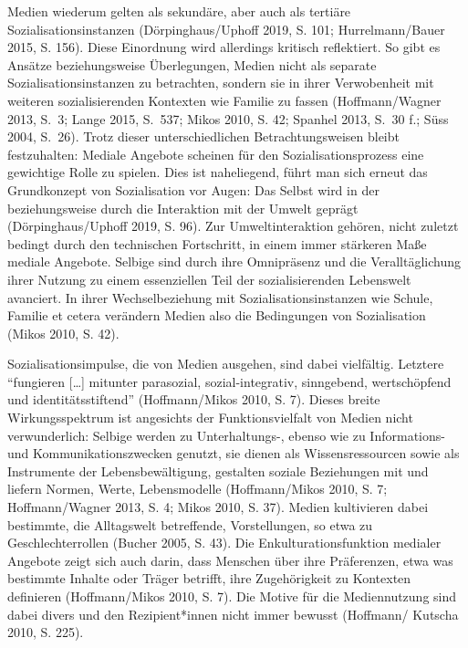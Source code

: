 \documentclass[a4paper,
fontsize=11pt,
oneside,
numbers=noperiodatend,
parskip=half-,
bibliography=totoc,
final
]{scrartcl}
\begin{document}
Medien wiederum gelten als sekundäre, aber auch als tertiäre
Sozialisationsinstanzen (Dörpinghaus/Uphoff 2019, S. 101;
Hurrelmann/Bauer 2015, S. 156). Diese Einordnung wird allerdings
kritisch reflektiert. So gibt es Ansätze beziehungsweise Überlegungen,
Medien nicht als separate Sozialisationsinstanzen zu betrachten, sondern
sie in ihrer Verwobenheit mit weiteren sozialisierenden Kontexten wie
Familie zu fassen (Hoffmann/Wagner 2013, S.~3; Lange 2015, S.~537; Mikos
2010, S. 42; Spanhel 2013, S.~30 f.; Süss 2004, S.~26). Trotz dieser
unterschiedlichen Betrachtungsweisen bleibt festzuhalten: Mediale
Angebote scheinen für den Sozialisationsprozess eine gewichtige Rolle zu
spielen. Dies ist naheliegend, führt man sich erneut das Grundkonzept
von Sozialisation vor Augen: Das Selbst wird in der beziehungsweise
durch die Interaktion mit der Umwelt geprägt (Dörpinghaus/Uphoff 2019,
S. 96). Zur Umweltinteraktion gehören, nicht zuletzt bedingt durch den
technischen Fortschritt, in einem immer stärkeren Maße mediale Angebote.
Selbige sind durch ihre Omnipräsenz und die Veralltäglichung ihrer
Nutzung zu einem essenziellen Teil der sozialisierenden Lebenswelt
avanciert. In ihrer Wechselbeziehung mit Sozialisationsinstanzen wie
Schule, Familie et cetera verändern Medien also die Bedingungen von
Sozialisation (Mikos 2010, S. 42).

Sozialisationsimpulse, die von Medien ausgehen, sind dabei vielfältig.
Letztere \enquote{fungieren {[}\ldots{]} mitunter parasozial,
sozial-integrativ, sinngebend, wertschöpfend und identitätsstiftend}
(Hoffmann/Mikos 2010, S. 7). Dieses breite Wirkungsspektrum ist
angesichts der Funktionsvielfalt von Medien nicht verwunderlich: Selbige
werden zu Unterhaltungs-, ebenso wie zu Informations- und
Kommunikationszwecken genutzt, sie dienen als Wissensressourcen sowie
als Instrumente der Lebensbewältigung, gestalten soziale Beziehungen mit
und liefern Normen, Werte, Lebensmodelle (Hoffmann/Mikos 2010, S. 7;
Hoffmann/Wagner 2013, S. 4; Mikos 2010, S. 37). Medien kultivieren dabei
bestimmte, die Alltagswelt betreffende, Vorstellungen, so etwa zu
Geschlechterrollen (Bucher 2005, S. 43). Die Enkulturationsfunktion
medialer Angebote zeigt sich auch darin, dass Menschen über ihre
Präferenzen, etwa was bestimmte Inhalte oder Träger betrifft, ihre
Zugehörigkeit zu Kontexten definieren (Hoffmann/Mikos 2010, S. 7). Die
Motive für die Mediennutzung sind dabei divers und den Rezipient*innen
nicht immer bewusst (Hoffmann/ Kutscha 2010, S. 225).
\end{document}
